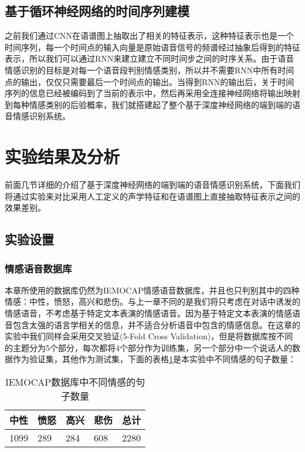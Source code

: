 \subsection{基于循环神经网络的时间序列建模}
\label{ssec:rnn_seq_model_detail}

之前我们通过CNN在语谱图上抽取出了相关的特征表示，这种特征表示也是一个时间序列，每一个时间点的输入向量是原始语音信号的频谱经过抽象后得到的特征表示，所以我们可以通过RNN来建立建立不同时间步之间的时序关系。由于语音情感识别的目标是对每一个语音段判别情感类别，所以并不需要RNN中所有时间点的输出，仅仅只需要最后一个时间点的输出。当得到RNN的输出后，关于时间序列的信息已经被编码到了当前的表示中，然后再采用全连接神经网络将输出映射到每种情感类别的后验概率，我们就搭建起了整个基于深度神经网络的端到端的语音情感识别系统。


\section{实验结果及分析}
\label{sec:end2end_experiment}

前面几节详细的介绍了基于深度神经网络的端到端的语音情感识别系统，下面我们将通过实验来对比采用人工定义的声学特征和在语谱图上直接抽取特征表示之间的效果差别。

\subsection{实验设置}
\label{ssec:end2end_experiment_setup}

\subsubsection{情感语音数据库}
\label{ssec:end2end_database}

本章所使用的数据库仍然为IEMOCAP情感语音数据库，并且也只判别其中的四种情感：中性，愤怒，高兴和悲伤。与上一章不同的是我们将只考虑在对话中诱发的情感语音，不考虑基于特定文本表演的情感语音。因为基于特定文本表演的情感语音包含太强的语言学相关的信息，并不适合分析语音中包含的情感信息。在这章的实验中我们同样会采用交叉验证(5-Fold Cross Validation)，但是将数据库按不同的主题分为5个部分，每次都将4个部分作为训练集，另一个部分中一个说话人的数据作为验证集，其他作为测试集，下面的表格\ref{tab:end2end_emo_sample_num}是本实验中不同情感的句子数量：

\begin{table}[htb]
\centering
\begin{minipage}[t]{0.8\linewidth} %
\caption{IEMOCAP数据库中不同情感的句子数量}
\label{tab:end2end_emo_sample_num}
    \begin{tabularx}{\linewidth}{X<{\centering} X<{\centering} X<{\centering} X<{\centering} X<{\centering}}
        \toprule[1.5pt]
        中性 & 愤怒 & 高兴 & 悲伤 & 总计 \\
        \midrule[1pt]
        1099 & 289 & 284 & 608 & 2280 \\
        \bottomrule[1.5pt]
    \end{tabularx}
\end{minipage}
\end{table}

